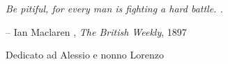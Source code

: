 
\cleardoublepage
{}
\thispagestyle{empty}

\epigraph{\itshape Be pitiful, for every man is fighting a hard battle. .}{-- Ian Maclaren , \textit{The British Weekly}, 1897}

\vspace*{5cm}


\begin{center}
Dedicato ad Alessio e nonno Lorenzo
\end{center}
